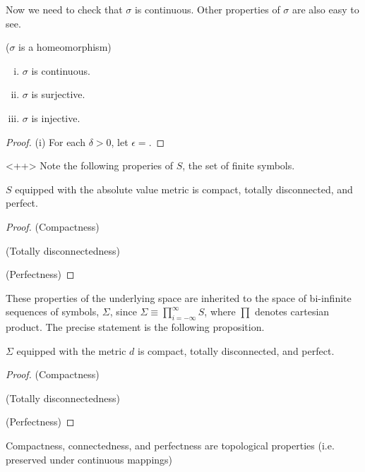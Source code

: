 \documentclass[12pt,twoside,draft]{book}
\begin{document}
Now we need to check that $\sigma$ is continuous.
Other properties of $\sigma$ are also easy to see.
\begin{proposition}
  ($\sigma$ is a homeomorphism)
  \begin{enumerate}[(i)]
    \item $\sigma$ is continuous.
    \item  $\sigma$ is surjective.
    \item  $\sigma$ is injective.
  \end{enumerate}
  \begin{proof}
    (i)
    For each $\delta > 0$, let $\epsilon = $.
  \end{proof}
  \label{prop:symb-sigma-cont}
\end{proposition}
\begin{proposition}
\end{proposition}
\begin{proposition}
\end{proposition}<++>
Note the following properies of $S$, the set of finite symbols.
\begin{proposition}
  $S$ equipped with the absolute value metric is compact, totally disconnected, and perfect.
\begin{proof}
  (Compactness)
  
  (Totally disconnectedness)

  (Perfectness)

\end{proof}
\end{proposition}
These properties of the underlying space are inherited to the space of bi-infinite sequences of symbols, $\Sigma$, since $\Sigma \equiv \prod\limits_{i = -\infty}^{\infty} S$, where $\prod$ denotes cartesian product.
The precise statement is the following proposition.
\begin{proposition}
  $\Sigma$ equipped with the metric $d$ is compact, totally disconnected, and perfect.
\begin{proof}
  (Compactness)
  
  (Totally disconnectedness)

  (Perfectness)

\end{proof}
\end{proposition}
\begin{proposition}
  Compactness, connectedness, and perfectness are topological properties (i.e. preserved under continuous mappings)
\end{proposition}
\end{document}
